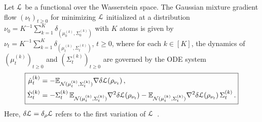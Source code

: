 \documentclass{custom}
\begin{document}
\begin{theorem}\label{thm:gmm_flow}
    Let $\EuScript{L}$ be a functional over the Wasserstein space.
    The Gaussian mixture gradient
    flow $(\nu_{t})_{t\geq0}$ for minimizing $\EuScript{L}$ initialized at a
    distribution $\nu_{0}=K^{-1}\sum_{k=1}^{K}\delta_{(\mu_{0}^{(k)},\Sigma_{0}^{(k)})}$
    with $K$ atoms is given by $\nu_{t}= K^{-1} \sum_{k=1}^{K}\delta_{(\mu_t^{(k)},\Sigma_t^{(k)})}$, $t\ge 0$,
    where for each $k\in[K]$, the dynamics of $(\mu_{t}^{(k)})_{t\geq0}$
    and $(\Sigma_{t}^{(k)})_{t\geq0}$ are governed by the ODE system
    \begin{align*}
    \boxed{\begin{aligned}
    \dot{\mu}_{t}^{(k)} &= - \mathbb E_{\mathcal N(\mu_t^{(k)},\Sigma_t^{(k)})}\nabla \delta \EuScript{L} (\rho_{\nu_t})\,, \\
    \dot\Sigma_t^{(k)}
    &= -\Sigma_t^{(k)}\,\mathbb E_{\mathcal N(\mu_t^{(k)},\Sigma_t^{(k)})}\nabla^2 \delta \EuScript{L}(\rho_{\nu_t}) - \mathbb E_{\mathcal N(\mu_t^{(k)},\Sigma_t^{(k)})}\nabla^2 \delta \EuScript{L}(\rho_{\nu_t}) \,\Sigma_t^{(k)}\,.
    \end{aligned}}
    \end{align*}
    Here, $\delta\EuScript{L} = \delta_\rho \EuScript{L}$ refers to the first variation of $\EuScript{L}$~\citep[see][Chapter 7]{San15OT}.
\end{theorem}
\end{document}
